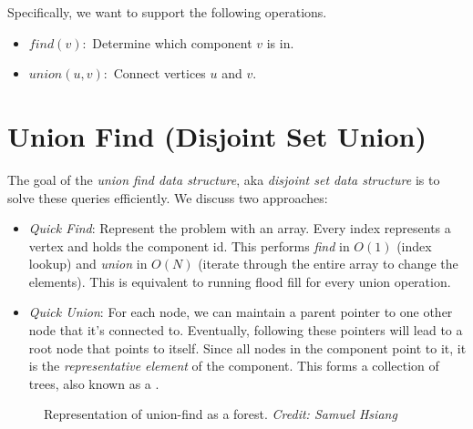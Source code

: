 \documentclass{article}
\begin{document}
Specifically, we want to support the following operations.

\begin{itemize}
    \item $find(v):$ Determine which component $v$ is in.
    \item $union(u, v): $ Connect vertices $u$ and $v$.
\end{itemize}

\section{Union Find (Disjoint Set Union)}
The goal of the \textit{union find data structure}, aka \textit{disjoint set data structure} is to solve these queries efficiently. We discuss two approaches:

\begin{itemize}
    \item \textit{Quick Find}: Represent the problem with an array. Every index represents a vertex and holds the component id. This performs \textit{find} in $O(1)$ (index lookup) and \textit{union} in $O(N)$ (iterate through the entire array to change the elements). This is equivalent to running flood fill for every union operation.
    \item \textit{Quick Union}: For each node, we can maintain a parent pointer to one other node that it’s connected to. Eventually, following these pointers will lead to a root node that points to itself. Since all nodes in the component point to it, it is the \textit{representative element} of the component. This forms a collection of trees, also known as a .
\end{itemize}

\pagebreak

\begin{figure}[h]
\centering
{}
\caption{Representation of union-find as a forest. \textit{Credit: Samuel Hsiang}}
\end{figure}
\end{document}
